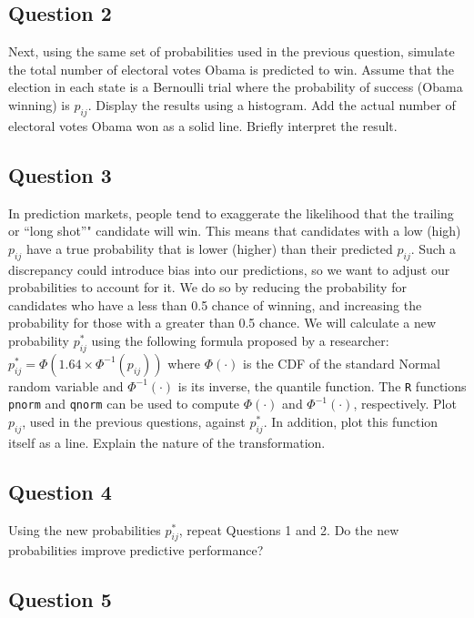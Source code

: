 \documentclass[]{article}
\begin{document}
\subsection{Question 2}\label{question-2}

Next, using the same set of probabilities used in the previous question,
simulate the total number of electoral votes Obama is predicted to win.
Assume that the election in each state is a Bernoulli trial where the
probability of success (Obama winning) is $p_{ij}$. Display the results
using a histogram. Add the actual number of electoral votes Obama won as
a solid line. Briefly interpret the result.

\subsection{Question 3}\label{question-3}

In prediction markets, people tend to exaggerate the likelihood that the
trailing or ``long shot''" candidate will win. This means that
candidates with a low (high) $p_{ij}$ have a true probability that is
lower (higher) than their predicted $p_{ij}$. Such a discrepancy could
introduce bias into our predictions, so we want to adjust our
probabilities to account for it. We do so by reducing the probability
for candidates who have a less than 0.5 chance of winning, and
increasing the probability for those with a greater than 0.5 chance. We
will calculate a new probability $p_{ij}^\ast$ using the following
formula proposed by a researcher:
$p^\ast_{ij} = \Phi(1.64 \times \Phi^{-1}(p_{ij}))$ where $\Phi(\cdot)$
is the CDF of the standard Normal random variable and $\Phi^{-1}(\cdot)$
is its inverse, the quantile function. The \texttt{R} functions
\texttt{pnorm} and \texttt{qnorm} can be used to compute $\Phi(\cdot)$
and $\Phi^{-1}(\cdot)$, respectively. Plot $p_{ij}$, used in the
previous questions, against $p_{ij}^\ast$. In addition, plot this
function itself as a line. Explain the nature of the transformation.

\subsection{Question 4}\label{question-4}

Using the new probabilities $p_{ij}^\ast$, repeat Questions 1 and 2. Do
the new probabilities improve predictive performance?

\subsection{Question 5}\label{question-5}
\end{document}
